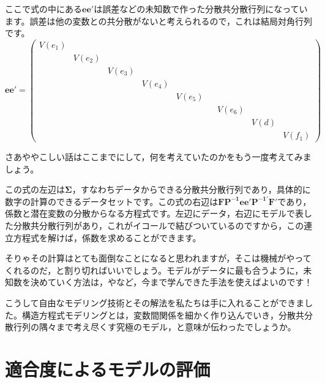 \documentclass{ltjsbook}
\begin{document}
ここで式の中にある$\bm{ee'}$は誤差などの未知数で作った分散共分散行列になっています。誤差は他の変数との共分散がないと考えられるので，これは結局対角行列です。
\[
    \bm{ee'}= \begin{pmatrix}  V(e_1) &        &        &        &        &  &        &      &        \\
                        & V(e_2) &        &        &        &  &        &      &        \\
                        &        & V(e_3) &        &        &  &        &      &        \\
                        &        &        & V(e_4) &        &  &        &      &        \\
                        &        &        &        & V(e_5) &  &        &      &        \\
                        &        &        &        &        &  & V(e_6) &      &        \\
                        &        &        &        &        &  &        & V(d) &        \\
                        &        &        &        &        &  &        &      & V(f_1)\end{pmatrix}
\]

さあややこしい話はここまでにして，何を考えていたのかをもう一度考えてみましょう。

この式の左辺は$\bm{\Sigma}$，すなわちデータからできる分散共分散行列であり，具体的に数字の計算のできるデータセットです。この式の右辺は$\bm{ FP^{-1} ee' P^{-1'} F' } $であり，係数と潜在変数の分散からなる方程式です。左辺にデータ，右辺にモデルで表した分散共分散行列があり，これがイコールで結びついているのですから，この連立方程式を解けば，係数を求めることができます。

そりゃその計算はとても面倒なことになると思われますが，そこは機械がやってくれるのだ，と割り切ればいいでしょう。モデルがデータに最も合うように，未知数を決めていく方法は，やなど，今まで学んできた手法を使えばよいのです！

こうして自由なモデリング技術とその解法を私たちは手に入れることができました。構造方程式モデリングとは，変数間関係を細かく作り込んでいき，分散共分散行列の隅々まで考え尽くす究極のモデル，と意味が伝わったでしょうか。

\section{適合度によるモデルの評価}
\end{document}
